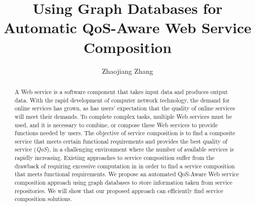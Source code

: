\documentclass[11pt
              , a4paper
              , twoside
              , openright
              ]{report}
\title{Using Graph Databases for Automatic QoS-Aware Web Service Composition}
\author{Zhaojiang Zhang}
\date{}
\theoremstyle{definition}
\begin{document}
\frontmatter




\begin{abstract}
A Web service is a software component that takes input data and produces output data. With the rapid development of computer network technology, the demand for online services has grown, as has users' expectation that the quality of online services will meet their demands. To complete complex tasks, multiple Web services must be used, and it is necessary to combine, or compose these Web services to provide functions needed by users. The objective of service composition is to find a composite service that meets certain functional requirements and provides the best quality of service (\emph{QoS}), in a challenging environment where the number of available services is rapidly increasing. Existing approaches to service composition suffer from the drawback of requiring excessive computation in in order to find a service composition that meets functional requirements. We propose an automated QoS-Aware Web service composition approach using graph databases to store information taken from service repositories. We will show that our proposed approach can efficiently find service composition solutions.\end{abstract}


\maketitle



\tableofcontents



\mainmatter










\backmatter



%


\end{document}
